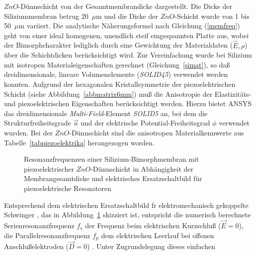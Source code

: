 $ZnO$-Dünnschicht von der Gesamtmembrandicke dargestellt. Die Dicke der
Siliziummembran betrug 20~$\mu$m und die Dicke der $ZnO$-Schicht wurde
von 1 bis 50~$\mu$m variiert. Die analytische Näherungsformel nach
Gleichung (\ref{memfreq}) geht von einer ideal homogenen, unendlich steif
eingespannten Platte aus, wobei der Bimorphcharakter lediglich durch eine
Gewichtung der Materialdaten ($\hat E, \rho$) über die Schichtdicken
berücksichtigt wird.
Zur Vereinfachung wurde bei Silizium mit isotropen Materialeigenschaften
gerechnet (Gleichung~\ref{simat}), so daß dreidimensionale, lineare
Volumenelemente ({\em SOLID45}) verwendet werden konnten. Aufgrund der
hexagonalen Kristallsymmetrie der piezoelektrischen Schicht
(siehe Abbildung~\ref{abbmatrix6mm}) muß die Anisotropie der Elastizitäts-
und piezoelektrischen Eigenschaften berücksichtigt werden. Hierzu bietet
{\sf ANSYS} das dreidimensionale {\em Multi-Field}-Element {\em SOLID5} an,
bei dem die Strukturfreiheitsgrade ${\vec u}$ und der elektrische
Potential-Freiheitsgrad $\phi$ verwendet wurden. Bei der $ZnO$-Dünnschicht
sind die anisotropen Materialkennwerte aus Tabelle~\ref{tabpiezoelektrika}
herangezogen worden. \\
\begin{figure}[htb]

\begin{center}

\setabbfzw
\end{center}
\caption{\label{abbvglbulktf}
 Resonanzfrequenzen einer Silizium-Bimorphmembran mit piezoelektrischer
 $ZnO$-Dünnschicht in Abhängigkeit der Membrangesamtdicke und elektrisches
 Ersatzschaltbild für piezoelektrische Resonatoren}
\end{figure}
Entsprechend dem elektrischen Ersatzschaltbild fr elektromechanisch
gekoppelte Schwinger \cite{IEEE}, das in Abbildung~\ref{abbvglbulktf}
skizziert ist, entspricht die numerisch berechnete Serienresonanzfrequenz
$f_{s}$ der Frequenz beim elektrischen Kurzschluß ($\vec E=0$), die
Parallelresonanzfrequenz $f_{p}$ dem elektrischen Leerlauf bei offenen
Anschlußelektroden ($\vec D=0$) \cite{Nai83}. Unter Zugrundelegung dieses
einfachen

